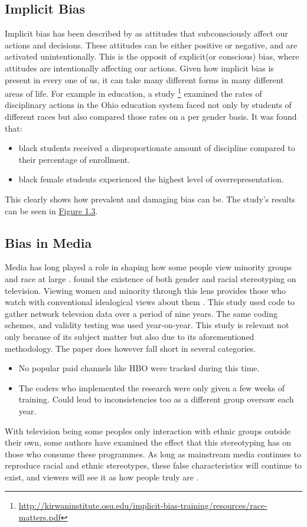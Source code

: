 \documentclass[oneside,12pt]{Classes/RoboticsLaTeX}
\begin{document}
\subsection{Implicit Bias}
Implicit bias has been described by \citet{imp_bias} as attitudes that subconsciously affect our actions and decisions. These attitudes can be either
positive or negative, and are activated unintentionally. This is the opposit of explicit(or conscious) bias, where attitudes are intentionally affecting our
actions. Given how implicit bias is present in every one of us, it can take many different forms in many different areas of life. For example in education, 
a study \footnote{\url{http://kirwaninstitute.osu.edu/implicit-bias-training/resources/race-matters.pdf}} examined the rates of disciplinary actions in the 
Ohio education system faced not only by students of different races but also compared those rates on a per gender basis. It was found that:
\begin{itemize}
  \item black students received a disproportionate amount of discipline compared to their percentage of enrollment.
  \item black female students experienced the highest level of overrepresentation.
\end{itemize}
This clearly shows how prevalent and damaging bias can be. The study's results can be seen in \hyperref[fig:Female_Rep]{Figure 1.3}.
\subsection{Bias in Media}
Media has long played a role in shaping how some people view minority groups and race at large \citep{Greenberg2002Minorities}.
\citet{mediastudy} found the existence of both gender and racial stereotyping on television. Viewing women and minority
through this lens provides those who watch with conventional idealogical views about them \citep{mediastudy}. This study used code
to gather network televsion data over a period of nine years. The same coding schemes, and validity testing was used year-on-year. 
This study is relevant not only because of its subject matter but also due to its aforementioned methodology. The paper does however
fall short in several categories.
\begin{itemize}
  \item No popular paid channels like HBO were tracked during this time.
  \item The coders who implemented the research were only given a few weeks of training. Could lead to inconsistencies too as a different group oversaw each year.
\end{itemize}
With television being some peoples only interaction with ethnic groups outside their own, some authors have examined the effect that this stereotyping has on those who consume these programmes. 
As long as mainstream media continues to reproduce racial and ethnic stereotypes, these false characteristics will continue to exist, and viewers will see it as 
how people truly are \citep{Castaneda}.
\end{document}
